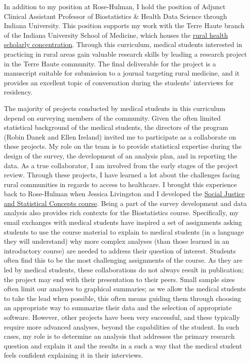 \documentclass[
  letterpaper,
  DIV=11,
  numbers=noendperiod]{scrreprt}
\begin{document}
In addition to my position at Rose-Hulman, I hold the position of
Adjunct Clinical Assistant Professor of Biostatistics \& Health Data
Science through Indiana University. This position supports my work with
the Terre Haute branch of the Indiana University School of Medicine,
which houses the
\href{https://medicine.iu.edu/md/curriculum/scholarly-concentrations/rural-health}{rural
health scholarly concentration}. Through this curriculum, medical
students interested in practicing in rural areas gain valuable research
skills by leading a research project in the Terre Haute community. The
final deliverable for the project is a manuscript suitable for
submission to a journal targeting rural medicine, and it provides an
excellent topic of conversation during the students' interviews for
residency.

The majority of projects conducted by medical students in this
curriculum depend on surveying members of the community. Given the often
limited statistical background of the medical students, the directors of
the program (Robin Danek and Ellen Ireland) invited me to participate as
a collaborate on these projects. My role on the team is to provide
statistical expertise during the design of the survey, the development
of an analysis plan, and in reporting the data. As a true collaborator,
I am involved from the early stages of the project review. Through these
projects, I have learned a lot about the challenges facing rural
communities in regards to access to healthcare. I brought this
experience back to Rose-Hulman when Jessica Livingston and I developed
the
\href{https://www.rose-hulman.edu/news/2023/interdisciplinary-course-bridges-data-science-and-storytelling.html}{Social
Justice and Statistical Concepts course}. Being a part of the survey
development and data analysis also provides rich contexts for the
Biostatistics course. Specifically, my email exchanges with medical
students have inspired a set of assignments asking students to use the
course material to explain to medical students (in a language they will
understand) why more complex analyses (than those learned in an
introductory course) are needed to address their question of interest.
Students often find this to be the most challenging assignments of the
course. As they are led by medical students, these collaborations do not
always result in publication; the project may end with their
presentation to their peers. Small sample sizes often limit our analyses
to graphical summaries; as we allow the medical students to take the
lead when possible, this often means guiding them through choosing an
appropriate way to summarize their data and the selection of appropriate
software. However, other projects have been very successful, and these
typically require more advanced analyses, beyond the capabilities of the
student. In such cases, my role is to determine an analysis that
addresses the primary research question and explain it and the results
in a such a way that the medical student feels confident explaining it
in their interviews.
\end{document}

